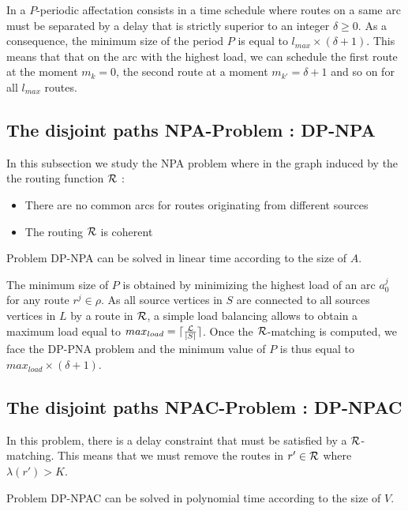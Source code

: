\documentclass{article}
\newcommand\rmatching{$\cal R$-matching\xspace}
\begin{document}
{In a $P$-periodic affectation consists in a time schedule where routes on a same arc must be separated by a delay that is strictly superior to an integer $\delta \geq 0$. As a consequence, the minimum size of the period $P$ is equal to $l_{max} \times (\delta + 1)$. This means that that on the arc with the highest load, we can schedule the first route at the moment $m_k = 0$, the second route at a moment $m_{k'} = \delta + 1$ and so on for all $l_{max}$ routes. 

\subsection{The disjoint paths NPA-Problem : DP-NPA}

In this subsection we study the NPA problem where in the graph induced by the the routing function $\cal R$ :
\begin{itemize}
\item There are no common arcs for routes originating from different sources
\item The routing $\cal R$ is coherent 
\end{itemize}

\begin{proposition}
\label{DP-NPA}
Problem DP-NPA can be solved in linear time according to the size of $A$.
\end{proposition}

The minimum size of $P$ is obtained by minimizing the highest load of an arc $a_0^j$ for any route $r^j \in \rho$. As all source vertices in $S$ are connected to all sources vertices in $L$ by a route in $\cal R$, a simple load balancing allows to obtain a maximum load equal to  $max_{load} = \lceil \frac{\cal L}{|S|} \rceil$. Once the \rmatching is computed, we face the DP-PNA problem and the minimum value of $P$ is thus equal to $max_{load} \times (\delta + 1)$.
 
\subsection{The disjoint paths NPAC-Problem : DP-NPAC}

In this problem, there is a delay constraint that must be satisfied by a \rmatching. This means that we must remove the routes in $r' \in \cal R$ where $\lambda(r') > K$.

\begin{proposition}
\label{DP-NPAC}
Problem DP-NPAC can be solved in polynomial time according to the size of $V$.
\end{proposition}

}
\end{document}
